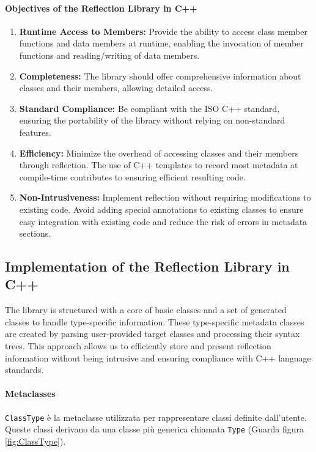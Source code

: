 \documentclass[11pt]{article}
\begin{document}
\begin{multicols*}{2}[\columnsep=1cm]
    \paragraph{Objectives of the Reflection Library in C++}
    \begin{enumerate}
        \item \textbf{Runtime Access to Members:} Provide the ability to access class member functions and data members at runtime, enabling the invocation of member functions and reading/writing of data members.
    
        \item \textbf{Completeness:} The library should offer comprehensive information about classes and their members, allowing detailed access.
    
        \item \textbf{Standard Compliance:} Be compliant with the ISO C++ standard, ensuring the portability of the library without relying on non-standard features.
    
        \item \textbf{Efficiency:} Minimize the overhead of accessing classes and their members through reflection. The use of C++ templates to record most metadata at compile-time contributes to ensuring efficient resulting code.
    
        \item \textbf{Non-Intrusiveness:} Implement reflection without requiring modifications to existing code. Avoid adding special annotations to existing classes to ensure easy integration with existing code and reduce the risk of errors in metadata sections.
    \end{enumerate}

    \subsection{Implementation of the Reflection Library in C++}
    The library is structured with a core of basic classes and a set of generated classes to handle type-specific information. These type-specific metadata classes are created by parsing user-provided target classes and processing their syntax trees. This approach allows us to efficiently store and present reflection information without being intrusive and ensuring compliance with C++ language standards.
    
    \paragraph{Metaclasses}
    \texttt{ClassType} è la metaclasse utilizzata per rappresentare classi definite dall'utente. 
    Queste classi derivano da una classe più generica chiamata \texttt{Type} (Guarda figura \ref*{fig:ClassType}).
    

\end{multicols*}
\end{document}
